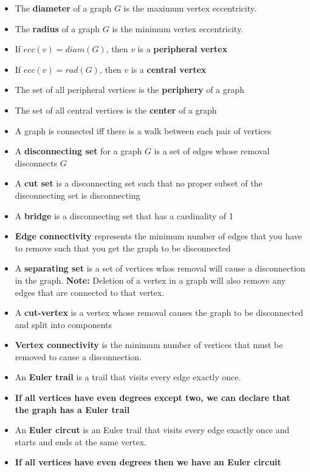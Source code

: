 \documentclass{report}
\begin{document}
\begin{itemize}
        \item The \textbf{diameter} of a graph $G$ is the maximum vertex eccentricity.
        \item The \textbf{radius} of a graph $G$ is the minimum vertex eccentricity.
        \item If $ecc(v)  = diam(G)$, then $v$ is a \textbf{peripheral vertex}
        \item If $ecc(v) = rad(G)$, then $v$ is a \textbf{central vertex}
        \item The set of all peripheral vertices is the \textbf{periphery} of a graph
        \item The set of all central vertices is the \textbf{center} of a graph
        \item A graph is connected iff there is a walk between each pair of vertices
        \item A \textbf{disconnecting set} for a graph $G$ is a set of edges whose removal disconnects $G$ 
        \item A \textbf{cut set} is a disconnecting set such that no proper subset of the disconnecting set is disconnecting
        \item A \textbf{bridge} is a disconnecting set that has a cardinality of 1
        \item \textbf{Edge connectivity} represents  the minimum number of edges that you have to remove such that you get the graph to be disconnected
        \item A \textbf{separating set} is a set of vertices whos removal will cause a disconnection in the graph.
          \textbf{Note:} Deletion of a vertex in a graph will also remove any edges that are connected to that vertex.
        \item A \textbf{cut-vertex} is a vertex whose removal causes the graph to be disconnected and split into components
        \item \textbf{Vertex connectivity} is the minimum number of vertices that must be removed to cause a disconnection.
        \item An \textbf{Euler trail} is a trail that visits every edge exactly once.
        \item \textbf{If all vertices have even degrees except two, we can declare that the graph has a Euler trail}
        \item An \textbf{Euler circut} is an Euler trail that visits every edge exactly once and starts and ends at the same vertex.
        \item \textbf{If all vertices have even degrees then we have an Euler circuit}

\end{itemize}
\end{document}
